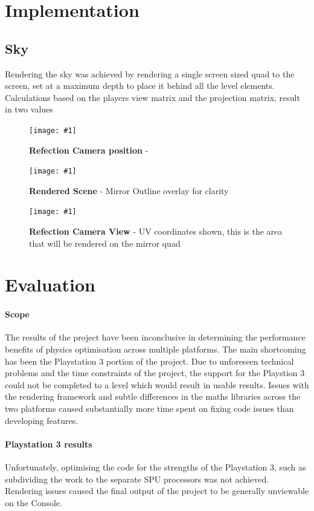 \documentclass[conference]{acmsiggraph}
\newcommand{\figuremacroW}[4]{
	\begin{figure}[h] %
		\centering
		\texttt{[image: \#1]}
		\caption[#2]{\textbf{#2} - #3}
		\label{fig:#1}
	\end{figure}
}
\begin{document}
\section{Implementation}

\subsection{Sky}
Rendering the sky was achieved by rendering a single screen sized quad to the screen, set at a maximum depth to place it behind all the level elements. Calculations based on the players view matrix and the projection matrix, result in two values 

\figuremacroW
{reflections}
{Refection Camera position}
{\protect\cite{Riemer}}
{1.0}


\figuremacroW
{front-Buffer}
{Rendered Scene}
{Mirror Outline overlay for clarity}
{1.0}


\figuremacroW
{ref-Buffer}
{Refection Camera View}
{UV coordinates shown, this is the area that will be rendered on the mirror quad}
{1.0}

\section{Evaluation}

\paragraph{Scope}
The results of the project have been inconclusive in determining the performance benefits of physics optimisation across multiple platforms. The main shortcoming has been the Playstation 3 portion of the project. Due to unforeseen technical problems and the time constraints of the project, the support for the Playstion 3 could not be completed to a level which would result in usable results. Issues with the rendering framework and subtle differences in the maths libraries across the two platforms caused substantially more time spent on fixing code issues than developing features.

\paragraph{Playstation 3 results}
Unfortunately, optimising the code for the strengths of the Playstation 3, such as subdividing the work to the separate SPU processors was not achieved. Rendering issues caused the final output of the project to be generally unviewable on the Console.
\end{document}

